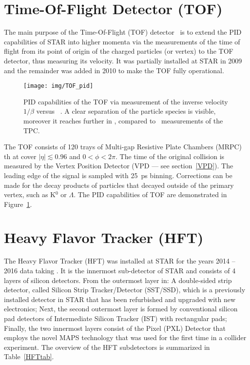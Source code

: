 \section{Time-Of-Flight Detector (TOF)\label{TOFsection}} 

The main purpose of the Time-Of-Flight (TOF) detector~\cite{TOFproposal} is to extend the PID capabilities of STAR into higher 
momenta via the measurements of the time of flight from its point of origin of the charged particles (or vertex) to the TOF 
detector, thus measuring its velocity. It was partially installed at STAR in 2009 and the remainder was added in 2010 
to make the TOF fully operational.

\begin{figure}[!htb]
\begin{center}
 \texttt{[image: img/TOF\_pid]}\\
\end{center}
\caption{\label{TOF_pid}PID capabilities of the TOF via measurement of the inverse velocity $1/\beta$ versus \pt~\cite{TOFpid}. A clear separation of the particle species is visible, moreover it reaches further in \pt, compared to \dedx\ measurements of the TPC.}
\end{figure}

The TOF consists of 120 trays of Multi-gap Resistive Plate Chambers (MRPC)~\cite{MRPC} th	at cover $|\eta| \lesssim 0.96$ and $0 < \phi < 2\pi$. The time of the original collision is measured 
by the Vertex Position Detector (VPD --- see section~\ref{VPD}). The leading edge of 
the signal is sampled with \SI{25}{\pico\second} binning. Corrections can be made for the decay products of particles that 
decayed outside of the primary vertex, such as K$^0$ or $\Lambda$. The PID capabilities of TOF are demonstrated in Figure~\ref{TOF_pid}.

\section{Heavy Flavor Tracker (HFT)\label{HFTsection}} 

The Heavy Flavor Tracker (HFT) was installed at STAR for the years 2014 -- 2016 data 
taking \cite{HftTdr, HFTLeo, HftFinal}. It is the innermost 
sub-detector of STAR and consists of 4
layers of silicon detectors. From the outermost layer in: A double-sided strip detector, called Silicon Strip
Tracker/Detector
(SST/SSD), which is a previously installed detector in STAR that has been
refurbished and upgraded with new electronics; Next, the second outermost layer is formed by conventional silicon 
pad detectors
of Intermediate Silicon Tracker (IST) 
with rectangular pads; Finally, the two innermost layers consist of the Pixel (PXL) 
Detector
that employs the novel MAPS technology that was used for the first time in a collider experiment. The overview of the 
HFT
subdetectors is summarized in Table~\ref{HFTtab}.

